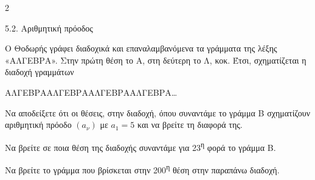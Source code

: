 \begin{ylh}{2}
    \item 5.2. Αριθμητική πρόοδος
\end{ylh}
Ο Θοδωρής γράφει διαδοχικά και επαναλαμβανόμενα τα γράμματα της λέξης «ΑΛΓΕΒΡΑ». Στην πρώτη θέση το Α, στη δεύτερη το Λ, κοκ. Έτσι, σχηματίζεται η διαδοχή γραμμάτων
\begin{center}
ΑΛΓΕΒΡΑΑΛΓΕΒΡΑΑΛΓΕΒΡΑΑΛΓΕΒΡΑ\ldots{}
\end{center}
\begin{alist}
\item Να αποδείξετε ότι οι θέσεις, στην διαδοχή, όπου συναντάμε το γράμμα Β σχηματίζουν αριθμητική πρόοδο $(a_\nu)$ με $a_1 = 5$ και να βρείτε τη διαφορά της.
\item Να βρείτε σε ποια θέση της διαδοχής συναντάμε για 23\textsuperscript{η} φορά το γράμμα Β.
\item Να βρείτε το γράμμα που βρίσκεται στην 200\textsuperscript{η} θέση στην παραπάνω διαδοχή.
\end{alist}

